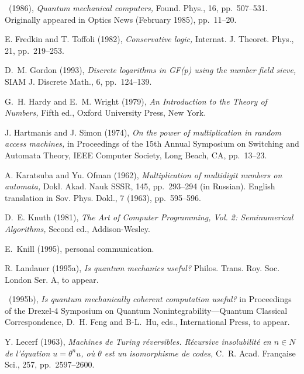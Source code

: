 {\begin{thebibliography}{}
  \sameauthor\  (1986), {\em Quantum mechanical 
computers,} {Found. Phys.,} {16,} pp.~507--531. \newblock
Originally appeared in {Optics News} (February 1985), pp.~11--20.

  {\sc E. Fredkin and T. Toffoli} 
(1982), {\em Conservative logic,}  {Internat. J. Theoret. Phys.,} {21,}
pp.~219--253.

  {\sc D.~M. Gordon} (1993), 
{\em Discrete logarithms in {\rm GF(p)} using the number field sieve,} 
{SIAM J. Discrete Math.,} {6,} pp.~124--139.

  {\sc G.~H. Hardy and E.~M. Wright} 
(1979), {\em An Introduction to the Theory of Numbers,} Fifth ed., Oxford 
University Press, New York.

 {\sc J. Hartmanis and J. Simon} 
(1974), {\em On the power of multiplication in random access machines,} in 
{Proceedings of the 15th Annual Symposium
on Switching and Automata Theory,} IEEE Computer Society, Long Beach, CA, 
pp.~13--23.

 {\sc A. Karatsuba and Yu. Ofman} 
(1962), {\em Multiplication of multidigit numbers on automata,} 
{Dokl. Akad. Nauk SSSR,} {145,} pp.~293--294 (in Russian). \newblock
English translation in Sov. Phys. Dokl., {7} (1963), pp.~595--596.

  {\sc D.~E. Knuth} (1981),
{\em The Art of Computer Programming, Vol. {\rm 2:} Seminumerical 
Algorithms,} Second ed., Addison-Wesley.

  {\sc E.~Knill} (1995),
personal communication.

 {\sc R. Landauer} (1995a), 
{\em Is quantum mechanics useful{\/\rm ?}} 
{Philos. Trans. Roy. Soc. London Ser. A}, to appear. 

 \sameauthor\ (1995b), 
{\em Is quantum mechanically coherent computation useful{\/\rm ?}} in 
{Proceedings of the Drexel-4 Symposium
on Quantum Nonintegrability---Quantum Classical Correspondence,}
D.~H. Feng and B-L.~Hu, eds., International Press, to appear.

 {\sc Y. Lecerf} (1963),  {\em Machines de Turing 
r\'eversibles.  R\'ecursive insolubilit\'e en $n \in N$ de l'\'equation 
$u=\theta^n u$,  o\`u $\theta$ est un isomorphisme de codes,}
{C.~R. Acad. Fran\c caise Sci.,} {257,} pp.~2597--2600.


\end{thebibliography}}
